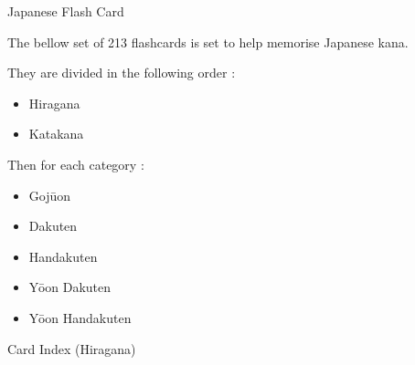 \newcommand{\sylHira}[0] {
\badge[ForestGreen]{Hiragana}
}

\newcommand{\sylKata}[0] {
\badge[Cyan]{Katakana\vphantom{Gojūon}}
}

\newcommand{\sylGojuon}[0] {
\badge[Dandelion]{Gojūon}
}

\newcommand{\sylYoon}[0] {
\badge[Peach]{Yōon\vphantom{Gojūon}}
}

\newcommand{\sylDak}[0] {
\badge[NavyBlue]{Dakuten\vphantom{Gojūon}}
}

\newcommand{\sylHan}[0] {
\badge[Red]{Handakuten\vphantom{Gojūon}}
}



\begin{center}
\huge
Japanese Flash Card
\end{center}

The bellow set of 213 flashcards is set to help memorise Japanese kana.

They are divided in the following order : 

\begin{itemize}
  \item Hiragana
  \item Katakana
\end{itemize}

Then for each category :

\begin{itemize}
  \item Gojūon
  \item Dakuten
  \item Handakuten
  \item Yōon Dakuten
  \item Yōon Handakuten
\end{itemize}

\newpage
\begin{center}
\huge
Card Index (Hiragana)
\end{center}



